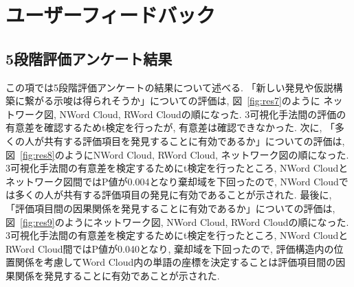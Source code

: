\documentclass[syuuron]{kuee}
\begin{document}
	\section{ユーザーフィードバック}
		\subsection{5段階評価アンケート結果}
		この項では5段階評価アンケートの結果について述べる. 
		「新しい発見や仮説構築に繋がる示唆は得られそうか」についての評価は, 図~\ref{fig:res7}のように
		ネットワーク図, NWord Cloud, RWord Cloudの順になった. 
		3可視化手法間の評価の有意差を確認するためt検定を行ったが, 有意差は確認できなかった. 
		次に, 「多くの人が共有する評価項目を発見することに有効であるか」についての評価は, 
		図~\ref{fig:res8}のようにNWord Cloud, RWord Cloud, ネットワーク図の順になった. 
		3可視化手法間の有意差を検定するためにt検定を行ったところ, NWord Cloudとネットワーク図間ではP値が0.004となり棄却域を下回ったので, 
		NWord Cloudでは多くの人が共有する評価項目の発見に有効であることが示された. 
		最後に, 「評価項目間の因果関係を発見することに有効であるか」についての評価は, 
		図~\ref{fig:res9}のようにネットワーク図, NWord Cloud, RWord Cloudの順になった. 
		3可視化手法間の有意差を検定するためにt検定を行ったところ, NWord CloudとRWord Cloud間ではP値が0.040となり, 
		棄却域を下回ったので, 評価構造内の位置関係を考慮してWord Cloud内の単語の座標を決定することは評価項目間の因果関係を発見することに有効であことが示された. 
	
\end{document}
